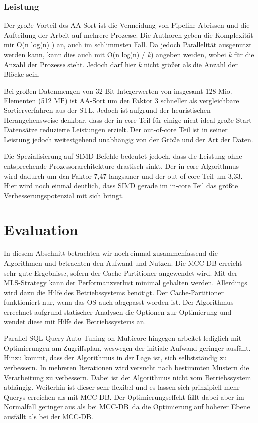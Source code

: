 \subsubsection*{Leistung}
\label{sec:AA-Sort_Leistung}

Der große Vorteil des AA-Sort ist die Vermeidung von Pipeline-Abrissen und die Aufteilung der Arbeit auf mehrere Prozesse. Die Authoren \cite{INOUE} geben die Komplexität mir O(n log(n) ) an, auch im schlimmsten Fall. Da jedoch Parallelität ausgenutzt werden kann, kann dies auch mit O(n log(n) / \textit{k}) angeben werden, wobei \textit{k} für die Anzahl der Prozesse steht. Jedoch darf hier \textit{k} nicht größer als die Anzahl der Blöcke sein. 

Bei großen Datenmengen von 32 Bit Integerwerten von insgesamt 128 Mio. Elementen (512 MB) ist AA-Sort um den Faktor 3 schneller als vergleichbare Sortierverfahren aus der STL. Jedoch ist aufgrund der heuristischen Herangehensweise denkbar, dass der in-core Teil für einige nicht ideal-große Start-Datensätze reduzierte Leistungen erzielt. Der out-of-core Teil ist in seiner Leistung jedoch weitestgehend unabhängig von der Größe und der Art der Daten.

Die Spezialisierung auf SIMD Befehle bedeutet jedoch, dass die Leistung ohne entsprechende Prozessorarchitekture drastisch sinkt. Der in-core Algorithmus wird dadurch um den Faktor 7,47 langsamer und der out-of-core Teil um 3,33. Hier wird noch einmal deutlich, dass SIMD gerade im in-core Teil das größte Verbesserungspotenzial mit sich bringt.

\section{Evaluation}
\label{sec:Evaluation}
In diesem Abschnitt betrachten wir noch einmal zusammenfassend die Algorithmen und betrachten den Aufwand und Nutzen.
Die MCC-DB erreicht sehr gute Ergebnisse, sofern der Cache-Partitioner angewendet wird. Mit der MLS-Strategy kann der Performanzverlust minimal gehalten werden. Allerdings wird dazu die Hilfe des Betriebssystems benötigt. Der Cache-Partitioner funktioniert nur, wenn das OS auch abgepasst worden ist. Der Algorithmus errechnet aufgrund statischer Analysen die Optionen zur Optimierung und wendet diese mit Hilfe des Betriebssystems an.

Parallel SQL Query Auto-Tuning on Multicore hingegen arbeitet lediglich mit Optimierungen am Zugriffsplan, weswegen der initiale Aufwand geringer ausfällt. Hinzu kommt, dass der Algorithmus in der Lage ist, sich selbstständig zu verbessern. In mehreren Iterationen wird versucht nach bestimmten Mustern die Verarbeitung zu verbessern. Dabei ist der Algorithmus nicht vom Betriebssystem abhängig. Weiterhin ist dieser sehr flexibel und es lassen sich prinzipiell mehr Querys erreichen als mit MCC-DB. Der Optimierungseffekt fällt dabei aber im Normalfall geringer aus als bei MCC-DB, da die Optimierung auf höherer Ebene ausfällt als bei der MCC-DB.

